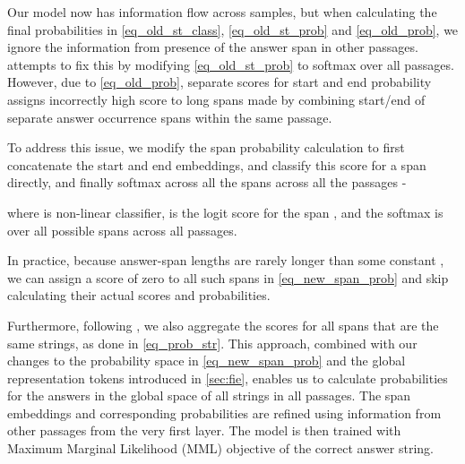 \documentclass[11pt]{article}
\begin{document}
Our model now has information flow across samples, but when calculating the final probabilities in \cref{eq_old_st_class}, \cref{eq_old_st_prob} and \cref{eq_old_prob}, we ignore the information from presence of the answer span in other passages. \citet{prob-assum} attempts to fix this by modifying \cref{eq_old_st_prob} to softmax over all passages. However, due to \cref{eq_old_prob}, separate scores for start and end probability assigns incorrectly high score to long spans made by combining start/end of separate answer occurrence spans within the same passage.

To address this issue, we modify the span probability calculation to first concatenate the start and end embeddings, and classify this score for a span directly, and finally softmax across all the spans across all the passages - 

where  is non-linear classifier,  is the logit score for the span , and the softmax is over all possible spans  across all passages. 

In practice, because answer-span lengths are rarely longer than some constant , we can assign a score of zero to all such spans in \cref{eq_new_span_prob} and skip calculating their actual scores and probabilities. 

Furthermore, following \citet{prob-assum}, we also aggregate the scores for all spans that are the same strings, as done in \cref{eq_prob_str}. This approach, combined with our changes to the probability space in \cref{eq_new_span_prob} and the global representation tokens introduced in \cref{sec:fie}, enables us to calculate probabilities for the answers in the global space of all strings in all passages. The span embeddings and corresponding probabilities are refined using information from other passages from the very first layer. The model is then trained with Maximum Marginal Likelihood (MML) objective of the correct answer string.
\end{document}
